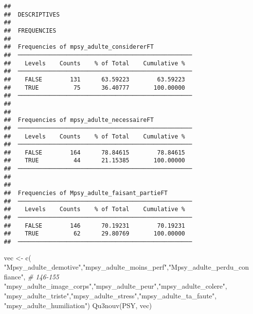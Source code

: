 \documentclass[
]{article}
\newenvironment{Shaded}{\begin{snugshade}}{\end{snugshade}}
\newcommand{\CommentTok}[1]{\textcolor[rgb]{0.56,0.35,0.01}{\textit{#1}}}
\newcommand{\FunctionTok}[1]{\textcolor[rgb]{0.00,0.00,0.00}{#1}}
\newcommand{\NormalTok}[1]{#1}
\newcommand{\OtherTok}[1]{\textcolor[rgb]{0.56,0.35,0.01}{#1}}
\newcommand{\StringTok}[1]{\textcolor[rgb]{0.31,0.60,0.02}{#1}}
\begin{document}
\begin{verbatim}
## 
##  DESCRIPTIVES
## 
##  FREQUENCIES
## 
##  Frequencies of mpsy_adulte_considererFT            
##  ────────────────────────────────────────────────── 
##    Levels    Counts    % of Total    Cumulative %   
##  ────────────────────────────────────────────────── 
##    FALSE        131      63.59223        63.59223   
##    TRUE          75      36.40777       100.00000   
##  ────────────────────────────────────────────────── 
## 
## 
##  Frequencies of mpsy_adulte_necessaireFT            
##  ────────────────────────────────────────────────── 
##    Levels    Counts    % of Total    Cumulative %   
##  ────────────────────────────────────────────────── 
##    FALSE        164      78.84615        78.84615   
##    TRUE          44      21.15385       100.00000   
##  ────────────────────────────────────────────────── 
## 
## 
##  Frequencies of Mpsy_adulte_faisant_partieFT        
##  ────────────────────────────────────────────────── 
##    Levels    Counts    % of Total    Cumulative %   
##  ────────────────────────────────────────────────── 
##    FALSE        146      70.19231        70.19231   
##    TRUE          62      29.80769       100.00000   
##  ──────────────────────────────────────────────────
\end{verbatim}

\begin{Shaded}
\begin{Highlighting}[]
\NormalTok{vec }\OtherTok{\textless{}{-}} \FunctionTok{c}\NormalTok{( }\StringTok{"Mpsy\_adulte\_demotive"}\NormalTok{,}\StringTok{"mpsy\_adulte\_moins\_perf"}\NormalTok{,}\StringTok{"Mpsy\_adulte\_perdu\_confiance"}\NormalTok{,  }\CommentTok{\# 146{-}155}
     \StringTok{"mpsy\_adulte\_image\_corps"}\NormalTok{,}\StringTok{"mpsy\_adulte\_peur"}\NormalTok{,}\StringTok{"mpsy\_adulte\_colere"}\NormalTok{,}
     \StringTok{"mpsy\_adulte\_triste"}\NormalTok{,}\StringTok{"mpsy\_adulte\_stress"}\NormalTok{,}\StringTok{"mpsy\_adulte\_ta\_faute"}\NormalTok{,}
     \StringTok{"mpsy\_adulte\_humiliation"}\NormalTok{)}
\FunctionTok{Qu3nouv}\NormalTok{(PSY, vec)}
\end{Highlighting}
\end{Shaded}
\end{document}
